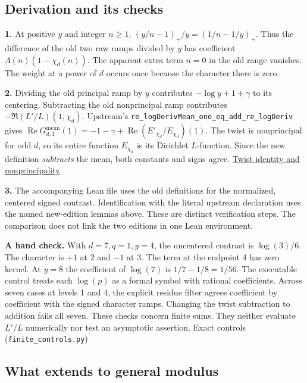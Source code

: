 \documentclass[11pt,letterpaper]{article}
\begin{document}
\subsection{Derivation and its checks}

\noindent\textbf{1.} At positive $y$ and integer $n\ge 1$, $(y/n-1)_+/y=(1/n-1/y)_+$. Thus the difference of the old two raw ramps divided by $y$ has coefficient $\Lambda(n)(1-\chi _d(n))$. The apparent extra term $n=0$ in the old range vanishes. The weight at a power of $d$ occurs once because the character there is zero.\par
\noindent\textbf{2.} Dividing the old principal ramp by $y$ contributes $-\log y+1+\gamma $ to its centering. Subtracting the old nonprincipal ramp contributes $-\Re (L'/L)(1,\chi _d)$. Upstream's \nolinkurl{re_logDerivMean_one_eq_add_re_logDeriv} gives $\operatorname{Re} G_{d,1}^{\mathrm{mean}}(1)=-1-\gamma +\operatorname{Re}(E'_{\chi _d}/E_{\chi _d})(1)$. The twist is nonprincipal for odd $d$, so its entire function $E_{\chi _d}$ is its Dirichlet $L$-function. Since the new definition \emph{subtracts} the mean, both constants and signs agree. \href{https://github.com/nousentllc/riemann-hypothesis/blob/e063a923620ee7787b4a1270421478645bf66bdb/src/Lib/Analytic/EntireLFunction.lean#L42-L66}{Twist identity and nonprincipality}\par
\noindent\textbf{3.} The accompanying Lean file uses the old definitions for the normalized, centered signed contrast. Identification with the literal upstream declaration uses the named new-edition lemmas above. These are distinct verification steps. The comparison does not link the two editions in one Lean environment.\par

\textbf{A hand check.} With $d=7,q=1,y=4$, the uncentered contrast is $\log(3)/6$. The character is $+1$ at 2 and $-1$ at 3. The term at the endpoint 4 has zero kernel. At $y=8$ the coefficient of $\log(7)$ is $1/7-1/8=1/56$. The executable control treats each $\log(p)$ as a formal symbol with rational coefficients. Across seven cases at levels 1 and 4, the explicit residue filter agrees coefficient by coefficient with the signed character ramps. Changing the twist subtraction to addition fails all seven. These checks concern finite sums. They neither evaluate $L'/L$ numerically nor test an asymptotic assertion. Exact controls (\nolinkurl{finite_controls.py})

\subsection{What extends to general modulus}
\end{document}
